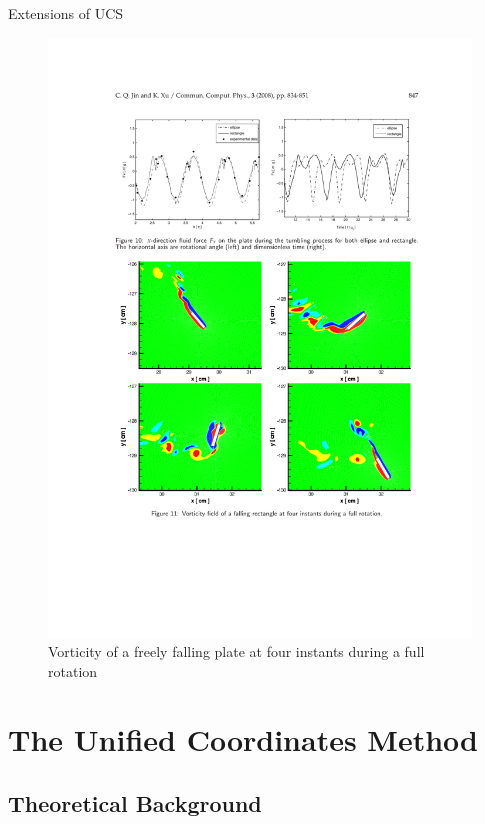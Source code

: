 \documentclass{beamer}
\begin{document}
\begin{frame}{Extensions of UCS}
  \begin{figure}
    \includegraphics[height=.7\textheight]{FallingPlateVorticity.pdf}
    \caption{Vorticity of a freely falling plate at four instants
      during a full rotation\cite{jin08}}
  \end{figure}
\end{frame}

\section{The Unified Coordinates Method}

\subsection{Theoretical Background}
\end{document}
